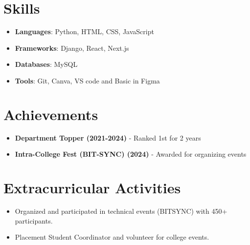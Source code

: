 \documentclass[11pt]{article}
\begin{document}
\section{Skills}
\begin{itemize}
    \item \textbf{Languages}: Python, HTML, CSS, JavaScript
    \item \textbf{Frameworks}: Django, React, Next.js
    \item \textbf{Databases}: MySQL
    \item \textbf{Tools}: Git, Canva, VS code and  Basic in Figma
\end{itemize}

\section{Achievements}
\begin{itemize}
    \item[\faCertificate] \textbf{Department Topper (2021-2024)} - Ranked 1st for 2 years
    \item[\faTrophy] \textbf{Intra-College Fest (BIT-SYNC) (2024)} - Awarded for organizing events
\end{itemize}


\section{Extracurricular Activities}
\begin{itemize}
    \item Organized and participated in technical events (BITSYNC) with 450+ participants.
    \item Placement Student Coordinator and volunteer for college events.
\end{itemize}
\end{document}
